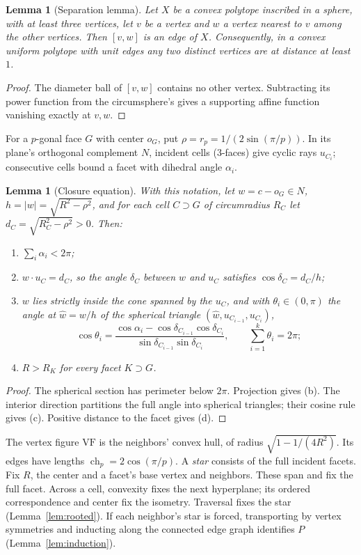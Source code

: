 \documentclass[11pt]{article}
\newtheorem{lemma}[theorem]{Lemma}
\theoremstyle{definition}
\theoremstyle{remark}
\newcommand{\VF}{\mathrm{VF}}
\newcommand{\ch}{\operatorname{ch}}
\begin{document}
\begin{lemma}[Separation lemma]\label{lem:sep}
Let $X$ be a convex polytope inscribed in a sphere, with at least three
vertices, let $v$ be a vertex and $w$ a vertex nearest to $v$ among the
other vertices. Then $[v,w]$ is an edge of $X$. Consequently, in a convex
uniform polytope with unit edges any two distinct vertices are at distance
at least $1$.
\end{lemma}
\begin{proof}
The diameter ball of $[v,w]$ contains no other vertex.
Subtracting its power function from the circumsphere's gives a supporting
affine function vanishing exactly at $v,w$.
\end{proof}

For a $p$-gonal face $G$ with center $o_G$, put $\rho=r_p=1/(2\sin(\pi/p))$.
In its plane's orthogonal complement $N$, incident cells (3-faces)
give cyclic rays $u_{C_i}$; consecutive cells bound a facet with
dihedral angle $\alpha_i$.

\begin{lemma}[Closure equation]\label{lem:closure}
With this notation, let $w=c-o_G\in N$, $h=|w|=\sqrt{R^2-\rho^2}$, and for
each cell $C\supset G$ of circumradius $R_C$ let
$d_C=\sqrt{R_C^2-\rho^2}>0$. Then:
\begin{enumerate}[label=\textup{(\alph*)}]
\item $\sum_i\alpha_i<2\pi$;
\item $w\cdot u_C=d_C$, so the angle $\delta_C$ between $w$ and $u_C$
  satisfies $\cos\delta_C=d_C/h$;
\item $w$ lies strictly inside the cone spanned by the $u_C$, and with
  $\theta_i\in(0,\pi)$ the angle at $\hat w=w/h$ of the spherical triangle
  $(\hat w,u_{C_{i-1}},u_{C_i})$,
  \[
  \cos\theta_i=\frac{\cos\alpha_i-\cos\delta_{C_{i-1}}\cos\delta_{C_i}}
  {\sin\delta_{C_{i-1}}\sin\delta_{C_i}},\qquad
  \sum_{i=1}^k\theta_i=2\pi;
  \]
\item $R>R_{K}$ for every facet $K\supset G$.
\end{enumerate}
\end{lemma}
\begin{proof}
The spherical section has perimeter below $2\pi$. Projection gives (b).
The interior direction partitions the full angle into spherical triangles;
their cosine rule gives (c). Positive distance to the facet gives (d).
\end{proof}

The vertex figure $\VF$ is the neighbors' convex hull, of radius
$\sqrt{1-1/(4R^2)}$. Its edges have lengths $\ch_p=2\cos(\pi/p)$.
A \emph{star} consists of the full incident facets.
Fix $R$, the center and a facet's base vertex and neighbors.
These span and fix the full facet. Across a cell, convexity fixes the next
hyperplane; its ordered correspondence and center fix the isometry.
Traversal fixes the star (Lemma~\ref{lem:rooted}).
If each neighbor's star is forced, transporting by vertex symmetries
and inducting along the connected edge graph identifies $P$
\cite{Balinski1961} (Lemma~\ref{lem:induction}).
\end{document}
